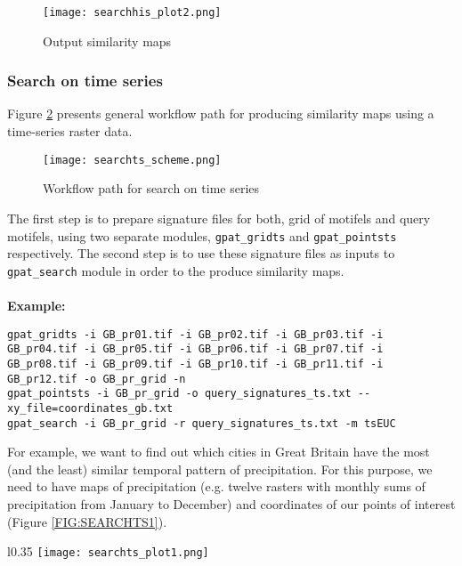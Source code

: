 \begin{figure}[H]
	\centering
	\texttt{[image: searchhis\_plot2.png]}
	\caption{Output similarity maps}
	\label{FIG:SEARCH2}
\end{figure}

\FloatBarrier

\subsubsection{Search on time series}
Figure \ref{FIG:SEARCHTS} presents general workflow path for producing similarity maps using a time-series raster data. 

\begin{figure}[H]
	\centering
	\texttt{[image: searchts\_scheme.png]}
	\caption{Workflow path for search on time series}
	\label{FIG:SEARCHTS}
\end{figure}

The first step is to prepare signature files for both, grid of motifels and query motifels, using two separate modules, {\tt gpat\_gridts} and {\tt gpat\_pointsts} respectively. 
The second step is to use these signature files as inputs to {\tt gpat\_search} module in order to the produce similarity maps.\\\\

{\bf Example:}

\begin{minipage}{\linewidth}
\begin{lstlisting}
gpat_gridts -i GB_pr01.tif -i GB_pr02.tif -i GB_pr03.tif -i GB_pr04.tif -i GB_pr05.tif -i GB_pr06.tif -i GB_pr07.tif -i GB_pr08.tif -i GB_pr09.tif -i GB_pr10.tif -i GB_pr11.tif -i GB_pr12.tif -o GB_pr_grid -n
gpat_pointsts -i GB_pr_grid -o query_signatures_ts.txt --xy_file=coordinates_gb.txt
gpat_search -i GB_pr_grid -r query_signatures_ts.txt -m tsEUC
\end{lstlisting}
\end{minipage}

For example, we want to find out which cities in Great Britain have the most (and the least) similar temporal pattern of precipitation. 
For this purpose, we need to have maps of precipitation (e.g. twelve rasters with monthly sums of precipitation from January to December) and coordinates of our points of interest (Figure \ref{FIG:SEARCHTS1}).

\newpage

\begin{wrapfigure}{l}{0.35\textwidth}
	\texttt{[image: searchts\_plot1.png]}
	\caption{Location of the points of interest}
	\label{FIG:SEARCHTS1}
\end{wrapfigure}


